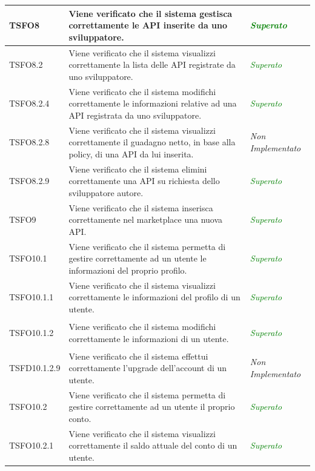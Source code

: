 \begin{longtable}{|>{\centering\arraybackslash}p{2.3cm}|>{\centering\arraybackslash}p{7.5cm} | >{\centering\arraybackslash}p{3.8cm}|}
		\hypertarget{TSFO8}{TSFO8} & Viene verificato che il sistema gestisca correttamente le API inserite da uno sviluppatore. & \textcolor{Green}{\textit{Superato}}\\ \hline
		\hypertarget{TSFO8.2}{TSFO8.2} & Viene verificato che il sistema visualizzi correttamente la lista delle API registrate da uno sviluppatore. & \textcolor{Green}{\textit{Superato}}\\ \hline
		\hypertarget{TSFO8.2.4}{TSFO8.2.4} & Viene verificato che il sistema modifichi correttamente le informazioni relative ad una API registrata da uno sviluppatore. & \textcolor{Green}{\textit{Superato}}\\ \hline
		\hypertarget{TSFO8.2.8}{TSFO8.2.8} & Viene verificato che il sistema visualizzi correttamente il guadagno netto, in base alla policy, di una API da lui inserita. & \textit{Non Implementato}\\ \hline
		\hypertarget{TSFO8.2.9}{TSFO8.2.9} & Viene verificato che il sistema elimini correttamente una API su richiesta dello sviluppatore autore. & \textcolor{Green}{\textit{Superato}}\\ \hline
		\hypertarget{TSFO9}{TSFO9} & Viene verificato che il sistema inserisca correttamente nel marketplace una nuova API. & \textcolor{Green}{\textit{Superato}}\\ \hline
		\hypertarget{TSFO10.1}{TSFO10.1} & Viene verificato che il sistema permetta di gestire correttamente ad un utente le informazioni del proprio profilo. & \textcolor{Green}{\textit{Superato}}\\ \hline
		\hypertarget{TSFO10.1.1}{TSFO10.1.1} & Viene verificato che il sistema visualizzi correttamente le informazioni del profilo di un utente. & \textcolor{Green}{\textit{Superato}}\\ \hline
		\hypertarget{TSFO10.1.2}{TSFO10.1.2} & Viene verificato che il sistema modifichi correttamente le informazioni di un utente. & \textcolor{Green}{\textit{Superato}}\\ \hline
		\hypertarget{TSFD10.1.2.9}{TSFD10.1.2.9} & Viene verificato che il sistema effettui correttamente l'upgrade dell'account di un utente. & \textit{Non Implementato}\\ \hline
		\hypertarget{TSFO10.2}{TSFO10.2} & Viene verificato che il sistema permetta di gestire correttamente ad un utente il proprio conto. & \textcolor{Green}{\textit{Superato}}\\ \hline
		\hypertarget{TSFO10.2.1}{TSFO10.2.1} & Viene verificato che il sistema visualizzi correttamente il saldo attuale del conto di un utente. & \textcolor{Green}{\textit{Superato}}\\ \hline

\end{longtable}

